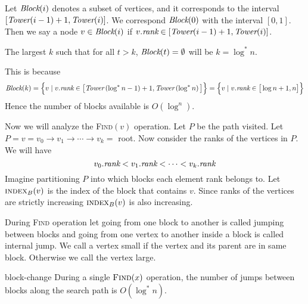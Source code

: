 Let $\emph{Block}(i)$ denotes a subset of vertices, and it corresponds to the interval $[\emph{Tower}(i-1)+1, \emph{Tower}(i)]$. We correspond $\emph{Block}(0)$ with the interval $ [0,1]$. Then we say a node $v\in \emph{Block}(i)$ if $v.\emph{rank}\in [\emph{Tower}(i-1)+1, \emph{Tower}(i)]$. 
\begin{observation}
	The largest $k$ such that for all $t>k$, $\emph{Block}(t)=\emptyset$ will be $k=\log^*n$.
\end{observation}This is because $$\emph{Block}(k)=\Big\{v\mid v.\emph{rank}\in \big[\emph{Tower}\left(\log^*n-1\right)+1,\emph{Tower}\left(\log^*n\right)\big]\Big\}=\Big\{v\mid v.\emph{rank}\in \big[ \log n+1,n\big]\Big\}$$Hence the number of blocks available is $O(\log^n)$.

Now we will analyze the \textsc{Find}$(v)$ operation. Let $P$ be the path visited. Let $P=v=v_0\to v_1\to\cdots \to v_k=$ root. Now consider the ranks of the vertices in $P$. We will have $$v_0.\emph{rank}<v_1.\emph{rank}<\cdots <v_k.\emph{rank}$$ Imagine partitioning $P$ into which blocks each element rank belongs to. Let $\textsc{index}_B(v)$ is the index of the block that contains $v$. Since ranks of the vertices are strictly increasing $\textsc{index}_B(v)$ is also increasing.

During \textsc{Find} operation let going from one block to another is called jumping between blocks and going from one vertex to another inside a block is called internal jump. We call a vertex small if the vertex and its parent are in same block. Otherwise we call the vertex large.
\begin{lemma}{}{block-change}
	During a single $\textsc{Find}(x)$ operation, the number of jumps between blocks along the search path is $O(\log^*n)$.
\end{lemma}

